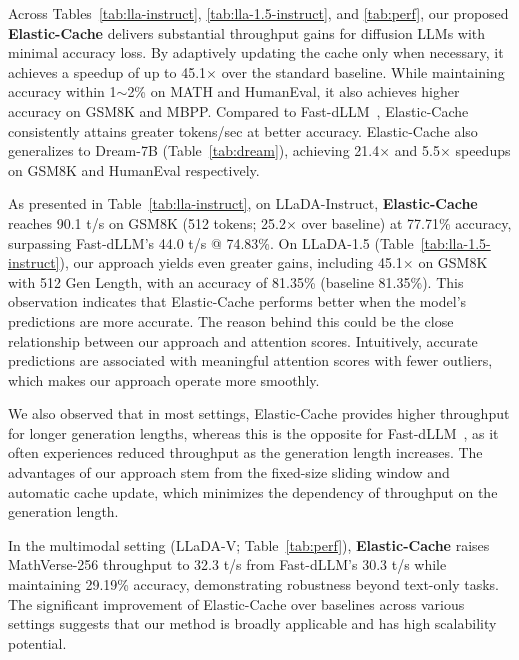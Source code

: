 \documentclass{article} %
\theoremstyle{definition}
\theoremstyle{remark}
\begin{document}
Across Tables~\ref{tab:lla-instruct}, \ref{tab:lla-1.5-instruct}, and \ref{tab:perf}, our proposed \textbf{Elastic-Cache} delivers substantial throughput gains for diffusion LLMs with minimal accuracy loss. By adaptively updating the cache only when necessary, it achieves a speedup of up to 45.1$\times$ over the standard baseline. While maintaining accuracy within 1$\sim$2\% on MATH and HumanEval, it also achieves higher accuracy on GSM8K and MBPP. Compared to Fast-dLLM~\citep{wu2025fast}, Elastic-Cache consistently attains greater tokens/sec at better accuracy. Elastic-Cache also generalizes to Dream-7B (Table~\ref{tab:dream}), achieving 21.4$\times$ and 5.5$\times$ speedups on GSM8K and HumanEval respectively.

As presented in Table~\ref{tab:lla-instruct}, on LLaDA-Instruct, \textbf{Elastic-Cache} reaches 90.1 t/s on GSM8K (512 tokens; 25.2$\times$ over baseline) at 77.71\% accuracy, surpassing Fast-dLLM's 44.0 t/s @ 74.83\%. On LLaDA-1.5 (Table~\ref{tab:lla-1.5-instruct}), our approach yields even greater gains, including 45.1$\times$ on  GSM8K with 512 Gen Length, with an accuracy of 81.35\% (baseline 81.35\%). This observation indicates that Elastic-Cache performs better when the model’s predictions are more accurate. The reason behind this could be the close relationship between our approach and attention scores. Intuitively, accurate predictions are associated with meaningful attention scores with fewer outliers, which makes our approach operate more smoothly.

We also observed that in most settings, Elastic-Cache provides higher throughput for longer generation lengths, whereas this is the opposite for Fast-dLLM~\citep{wu2025fast}, as it often experiences reduced throughput as the generation length increases. The advantages of our approach stem from the fixed-size sliding window and automatic cache update, which minimizes the dependency of throughput on the generation length.

In the multimodal setting (LLaDA-V; Table~\ref{tab:perf}), \textbf{Elastic-Cache} raises MathVerse-256 throughput to 32.3 t/s from Fast-dLLM's 30.3 t/s while maintaining 29.19\% accuracy, demonstrating robustness beyond text-only tasks. The significant improvement of Elastic-Cache over baselines across various settings suggests that our method is broadly applicable and has high scalability potential.
\end{document}
